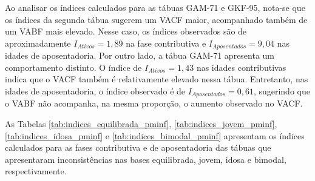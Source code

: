 Ao analisar os índices calculados para as tábuas GAM-71 e GKF-95, nota-se que os índices da segunda tábua sugerem um VACF maior, acompanhado também de um VABF mais elevado. Nesse caso, os índices observados são de aproximadamente $I_{Ativos} = 1,89$ na fase contributiva e $I_{Aposentados} = 9,04$ nas idades de aposentadoria. Por outro lado, a tábua GAM-71 apresenta um comportamento distinto. O índice de $I_{Ativos} = 1,43$ nas idades contributivas indica que o VACF também é relativamente elevado nessa tábua. Entretanto, nas idades de aposentadoria, o índice observado é de $I_{Aposentados} = 0,61$, sugerindo que o VABF não acompanha, na mesma proporção, o aumento observado no VACF.

As Tabelas \ref{tab:indices_equilibrada_pminf}, \ref{tab:indices_jovem_pminf}, \ref{tab:indices_idosa_pminf} e \ref{tab:indices_bimodal_pminf} apresentam os índices calculados para as fases contributiva e de aposentadoria das tábuas que apresentaram inconsistências nas bases equilibrada, jovem, idosa e bimodal, respectivamente.
\newpage
